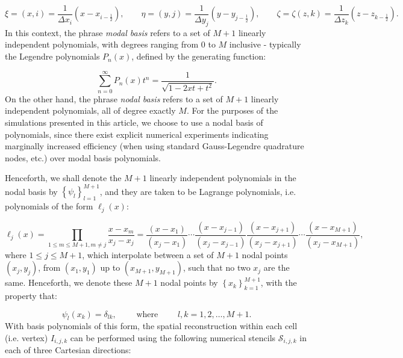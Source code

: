 \documentclass{article}
\begin{document}
\begin{equation}
\xi = \left( x, i \right) = \frac{1}{\Delta x_i} \left( x - x_{i - \frac{1}{2}} \right), \qquad \eta = \left( y, j \right) = \frac{1}{\Delta y_j} \left( y - y_{j - \frac{1}{2}} \right), \qquad \zeta = \zeta \left( z, k \right) = \frac{1}{\Delta z_k} \left( z - z_{k - \frac{1}{2}} \right).
\end{equation}
In this context, the phrase \textit{modal basis} refers to a set of ${M + 1}$ linearly independent polynomials, with degrees ranging from 0 to $M$ inclusive - typically the Legendre polynomials ${P_n \left( x \right)}$, defined by the generating function:

\begin{equation}
\sum_{n = 0}^{\infty} P_n \left( x \right) t^n = \frac{1}{\sqrt{1 - 2 x t + t^2}}.
\end{equation}
On the other hand, the phrase \textit{nodal basis} refers to a set of ${M + 1}$ linearly independent polynomials, all of degree exactly $M$. For the purposes of the simulations presented in this article, we choose to use a nodal basis of polynomials, since there exist explicit numerical experiments\cite{hidalgo} indicating marginally increased efficiency (when using standard Gauss-Legendre quadrature nodes, etc.) over modal basis polynomials.

Henceforth, we shall denote the ${M + 1}$ linearly independent polynomials in the nodal basis by ${\left\lbrace \psi_l \right\rbrace_{l = 1}^{M + 1}}$, and they are taken to be Lagrange polynomials, i.e. polynomials of the form ${\ell_j \left( x \right)}$:

\begin{equation}
\ell_j \left( x \right) = \prod_{1 \leq m \leq M + 1, m \neq j} \frac{x - x_m}{x_j - x_j} = \frac{\left( x - x_1 \right)}{\left( x_j - x_1 \right)} \cdots \frac{\left( x - x_{ j - 1} \right)}{\left( x_j - x_{j - 1} \right)} \frac{ \left( x - x_{j + 1} \right)}{\left( x_j - x_{j + 1} \right)} \cdots \frac{\left( x - x_{M + 1} \right)}{\left( x_j - x_{M + 1} \right)},
\end{equation}
where ${1 \leq j \leq M + 1}$, which interpolate between a set of ${M + 1}$ nodal points ${\left( x_j, y_j \right)}$, from ${\left( x_1, y_1 \right)}$ up to ${\left( x_{M + 1}, y_{M + 1} \right)}$, such that no two ${x_j}$ are the same. Henceforth, we denote these ${M + 1}$ nodal points by ${\left\lbrace x_k \right\rbrace_{k = 1}^{M + 1}}$, with the property that:

\begin{equation}
\psi_l \left( x_k \right) = \delta_{l k}, \qquad \text{ where } \qquad l, k = 1, 2, \dots, M + 1.
\end{equation}
With basis polynomials of this form, the spatial reconstruction within each cell (i.e. vertex) ${I_{i, j, k}}$ can be performed using the following numerical stencils ${\mathcal{S}_{i, j, k}}$ in each of three Cartesian directions:
\end{document}
